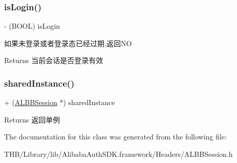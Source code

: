 \subsubsection{\texorpdfstring{is\+Login()}{isLogin()}}
{\footnotesize\ttfamily -\/ (B\+O\+OL) is\+Login \begin{DoxyParamCaption}{ }\end{DoxyParamCaption}}

如果未登录或者登录态已经过期,返回\+NO \begin{DoxyReturn}{Returns}
当前会话是否登录有效 
\end{DoxyReturn}
\mbox{\label{interface_a_l_b_b_session_a766474152f755bb796925950fe2f11ce}} 
\subsubsection{\texorpdfstring{shared\+Instance()}{sharedInstance()}}
{\footnotesize\ttfamily + (\mbox{\hyperlink{interface_a_l_b_b_session}{A\+L\+B\+B\+Session}} $\ast$) shared\+Instance \begin{DoxyParamCaption}{ }\end{DoxyParamCaption}}

\begin{DoxyReturn}{Returns}
返回单例 
\end{DoxyReturn}


The documentation for this class was generated from the following file\+:\begin{DoxyCompactItemize}
\item 
T\+H\+B/\+Library/lib/\+Alibaba\+Auth\+S\+D\+K.\+framework/\+Headers/A\+L\+B\+B\+Session.\+h\end{DoxyCompactItemize}
